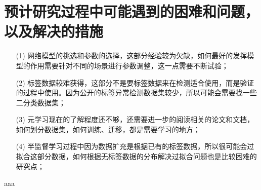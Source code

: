 \section{预计研究过程中可能遇到的困难和问题，以及解决的措施}

\begin{itemize}
    \item[(1)] 网络模型的挑选和参数的选择，这部分经验较为欠缺，如何最好的发挥模型的作用需要针对不同的场景进行参数调整，这一点需要不断试验；
    \item[(2)] 标签数据较难获得，这部分不是要标签数据来在检测适合使用，而是验证的过程中使用。因为公开的标签异常检测数据集较少，所以可能会需要找一些二分类数据集；
    \item[(3)] 元学习现在的了解程度还不够，还需要进一步的阅读相关的论文和文档，如何划分数据集，如何训练、迁移，都是需要学习的地方；
    \item[(4)] 半监督学习过程中因为数据扩充是根据已有的标签数据，所以很可能会过拟合这部分数据，如何根据无标签数据的分布解决过拟合问题也是比较困难的研究点；
\end{itemize}



aaa\cite{hithesis2017}

